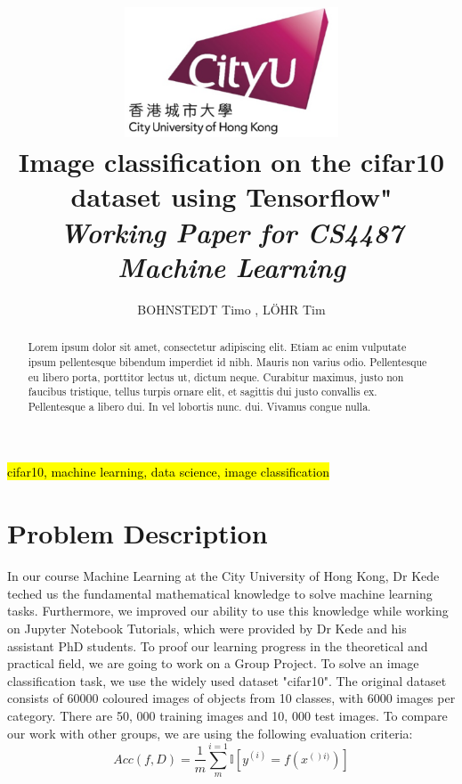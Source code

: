 \documentclass[journal]{IEEEtran}
\begin{document}
    \title{\includegraphics[width=2.5in]{photo/0_cityu} \\
    Image  classification on the cifar10 dataset using Tensorflow"\\
     \textit{Working Paper for CS4487 Machine Learning}
     }
  \author{BOHNSTEDT 	Timo ,
      L\"OHR Tim\\ 
}

\maketitle
\begin{abstract}
Lorem ipsum dolor sit amet, consectetur adipiscing elit. Etiam ac enim vulputate ipsum pellentesque bibendum imperdiet id nibh. Mauris non varius odio. Pellentesque eu libero porta, porttitor lectus ut, dictum neque. Curabitur maximus, justo non faucibus tristique, tellus turpis ornare elit, et sagittis dui justo convallis ex. Pellentesque a libero dui. In vel lobortis nunc. dui. Vivamus congue nulla.
\end{abstract}

\begin{IEEEkeywords}
\hl{cifar10, machine learning, data science, image classification}
\end{IEEEkeywords}

\IEEEpeerreviewmaketitle

\section{Problem Description}
In our course Machine Learning at the City University of Hong Kong, Dr Kede teched us the fundamental mathematical knowledge to solve machine learning tasks. Furthermore, we improved our ability to use this knowledge while working on Jupyter Notebook Tutorials, which were provided by Dr Kede and his assistant PhD students. To proof our learning progress in the theoretical and practical field, we are going to work on a Group Project. To solve an image classification task, we use the widely used dataset "cifar10". The original dataset consists of 60000 coloured images of objects from 10 classes, with 6000 images per category. There are 50, 000 training images and 10, 000 test images. To compare our work with other groups, we are using the following evaluation criteria:
\begin{equation}
Acc(f,D) = \frac{1}{m}\sum_{m}^{i=1} \mathbb{I} \left [ y^{(i)} =f(x^{()i)})\right ]
\end{equation}
\end{document}
